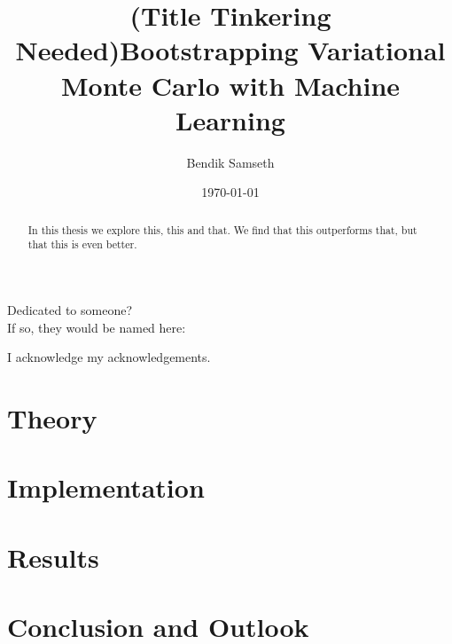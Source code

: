 \documentclass[twoside,english]{uiofysmaster}
\author{Bendik Samseth}
\title{(Title Tinkering Needed)Bootstrapping Variational Monte Carlo with Machine Learning}
\date{\monthyeardate\today}
\begin{document}
\maketitle

\begin{abstract}
    In this thesis we explore this, this and that. We find that this outperforms that, but that this is even better.
\end{abstract}


\begin{dedication}
  Dedicated to someone?
  \\\vspace{12pt}
  If so, they would be named here:
\end{dedication}

\begin{acknowledgements}
  I acknowledge my acknowledgements.
\end{acknowledgements}

\tableofcontents



\part{Theory}





\part{Implementation}




\part{Results}
\label{prt:results}


\part{Conclusion and Outlook}


\printbibliography[heading=bibintoc, title={References}]
\end{document}
